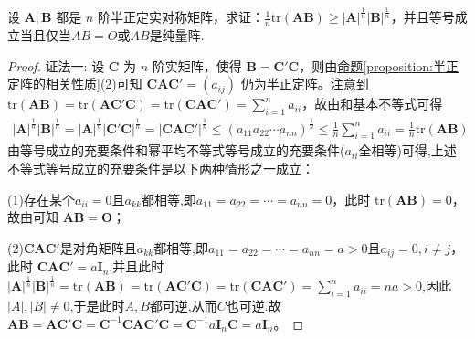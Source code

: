 \documentclass[../../main.tex]{subfiles}%
\begin{document}
\begin{proposition}\label{proposition:半正定阵的迹与行列式相关不等式}
设 \(\boldsymbol{A},\boldsymbol{B}\) 都是 \(n\) 阶半正定实对称矩阵，求证：\(\frac{1}{n}\mathrm{tr}(\boldsymbol{A}\boldsymbol{B})\geqslant |\boldsymbol{A}|^{\frac{1}{n}}|\boldsymbol{B}|^{\frac{1}{n}}\)，并且等号成立当且仅当$AB=O$或$AB$是纯量阵.
\end{proposition}
\begin{proof}

{\color{blue}证法一:}
设 \(\boldsymbol{C}\) 为 \(n\) 阶实矩阵，使得 \(\boldsymbol{B}=\boldsymbol{C}'\boldsymbol{C}\)，则由\hyperref[proposition:半正定阵的相关性质]{命题\ref{proposition:半正定阵的相关性质}(2)}可知 \(\boldsymbol{C}\boldsymbol{A}\boldsymbol{C}'=(a_{ij})\) 仍为半正定阵。注意到 \(\mathrm{tr}(\boldsymbol{A}\boldsymbol{B})=\mathrm{tr}(\boldsymbol{A}\boldsymbol{C}'\boldsymbol{C})=\mathrm{tr}(\boldsymbol{C}\boldsymbol{A}\boldsymbol{C}')=\sum_{i = 1}^{n}a_{ii}\)，故由和基本不等式可得
\begin{align*}
|\boldsymbol{A}|^{\frac{1}{n}}|\boldsymbol{B}|^{\frac{1}{n}}=|\boldsymbol{A}|^{\frac{1}{n}}|\boldsymbol{C}'\boldsymbol{C}|^{\frac{1}{n}}=|\boldsymbol{C}\boldsymbol{A}\boldsymbol{C}'|^{\frac{1}{n}}\leqslant (a_{11}a_{22}\cdots a_{nn})^{\frac{1}{n}}\leqslant \frac{1}{n}\sum_{i = 1}^{n}a_{ii}=\frac{1}{n}\mathrm{tr}(\boldsymbol{A}\boldsymbol{B})
\end{align*}
由等号成立的充要条件和幂平均不等式等号成立的充要条件($a_{ii}$全相等)可得,上述不等式等号成立的充要条件是以下两种情形之一成立：

(1)存在某个$a_{ii}=0$且$a_{kk}$都相等,即\(a_{11}=a_{22}=\cdots=a_{nn}=0\)，此时 \(\mathrm{tr}(\boldsymbol{A}\boldsymbol{B}) = 0\)，故由可知 \(\boldsymbol{A}\boldsymbol{B}=\boldsymbol{O}\)；

(2)$\boldsymbol{C}\boldsymbol{A}\boldsymbol{C}'$是对角矩阵且$a_{kk}$都相等,即\(a_{11}=a_{22}=\cdots=a_{nn}=a>0\)且$a_{ij}=0,i\ne j$，此时
\(\boldsymbol{C}\boldsymbol{A}\boldsymbol{C}'=a\boldsymbol{I}_n\).并且此时\(|\boldsymbol{A}|^{\frac{1}{n}}|\boldsymbol{B}|^{\frac{1}{n}}=\mathrm{tr}(\boldsymbol{A}\boldsymbol{B})=\mathrm{tr}(\boldsymbol{A}\boldsymbol{C}'\boldsymbol{C})=\mathrm{tr}(\boldsymbol{C}\boldsymbol{A}\boldsymbol{C}')=\sum_{i = 1}^{n}a_{ii}=na>0\),因此$|A|,|B|\ne0$,于是此时$A,B$都可逆,从而$C$也可逆.故 \(\boldsymbol{AB}=\boldsymbol{AC}' \boldsymbol{C}=\boldsymbol{C}^{-1}\boldsymbol{CAC}' \boldsymbol{C}=\boldsymbol{C}^{-1}a\boldsymbol{I}_n\boldsymbol{C}=a\boldsymbol{I}_n\)。


\end{proof}
\end{document}
